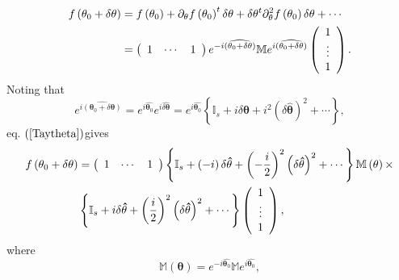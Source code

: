 \documentclass[aps,preprint]{revtex4}%
\begin{document}
\begin{align}
f\left(  \mathbf{\theta}_{0}+\delta\mathbf{\theta}\right)   &  =f\left(
\mathbf{\theta}_{0}\right)  +\partial_{\mathbf{\theta}}f\left(  \mathbf{\theta
}_{0}\right)  ^{t}\delta\mathbf{\theta}+\delta\mathbf{\theta}^{t}%
\partial_{\mathbf{\theta}}^{2}f\left(  \mathbf{\theta}_{0}\right)
\delta\mathbf{\theta+\cdots}\nonumber\\
&  =\left(
\begin{array}
[c]{ccc}%
1 & \cdots & 1
\end{array}
\right)  e^{-i\widehat{\left(  \mathbf{\theta}_{0}+\delta\mathbf{\theta
}\right)  }}\mathbb{M}e^{i\widehat{\left(  \mathbf{\theta}_{0}+\delta
\mathbf{\theta}\right)  }}\left(
\begin{array}
[c]{c}%
1\\
\vdots\\
1
\end{array}
\right)  .\label{Taytheta}%
\end{align}
Noting that
\begin{equation}
e^{i\widehat{\left(  \mathbf{\theta}_{0}+\delta\mathbf{\theta}\right)  }%
}=e^{i\widehat{\mathbf{\theta}_{0}}}e^{i\widehat{\delta\mathbf{\theta}}%
}=e^{i\widehat{\mathbf{\theta}_{0}}}\left\{  \mathbb{I}_{s}+i\delta
\mathbf{\hat{\theta}}+i^{2}\left(  \delta\mathbf{\hat{\theta}}\right)
^{2}+\cdots\right\}  ,
\end{equation}
eq. $\left(  \ref{Taytheta}\right)  $gives
\begin{align}
f\left(  \mathbf{\theta}_{0}+\delta\mathbf{\theta}\right)   &  =\left(
\begin{array}
[c]{ccc}%
1 & \cdots & 1
\end{array}
\right)  \left\{  \mathbb{I}_{s}+\left(  -i\right)  \delta\mathbf{\hat{\theta
}}+\left(  -\frac{i}{2}\right)  ^{2}\left(  \delta\mathbf{\hat{\theta}%
}\right)  ^{2}+\cdots\right\}  \mathbb{M}\left(  \mathbf{\theta}\right)
\times\nonumber\\
&  \left\{  \mathbb{I}_{s}+i\delta\mathbf{\hat{\theta}}+\left(  \frac{i}%
{2}\right)  ^{2}\left(  \delta\mathbf{\hat{\theta}}\right)  ^{2}%
+\cdots\right\}  \left(
\begin{array}
[c]{c}%
1\\
\vdots\\
1
\end{array}
\right)  ,
\end{align}
where
\begin{equation}
\mathbb{M}\left(  \mathbf{\theta}\right)  =e^{-i\widehat{\mathbf{\theta}_{0}}%
}\mathbb{M}e^{i\widehat{\mathbf{\theta}_{0}}},
\end{equation}
\end{document}
